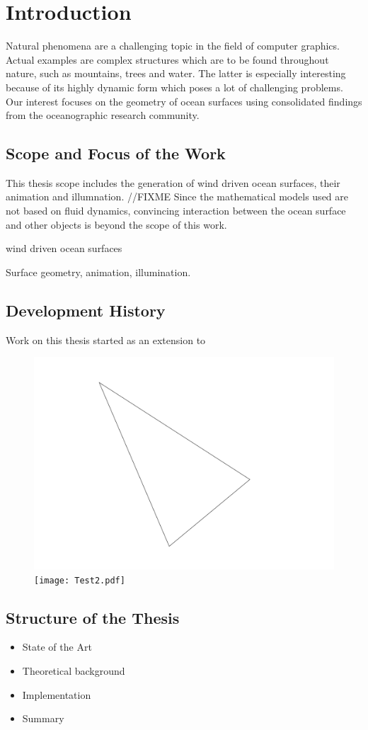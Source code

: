 \chapter{Introduction}

Natural phenomena are a challenging topic in the field of computer graphics.
Actual examples are complex structures which are to be found throughout nature,
such as mountains, trees and water. The latter is especially interesting
because of its highly dynamic form which poses a lot of challenging problems.
Our interest focuses on the geometry of ocean surfaces using
consolidated findings from the oceanographic research community.

\section{Scope and Focus of the Work}

This thesis scope includes the generation of wind driven ocean surfaces, their
animation and illumnation. //FIXME
Since the mathematical models used are not based on fluid dynamics,
convincing interaction between the ocean surface and other objects is beyond the
scope of this work.

wind driven ocean surfaces

Surface geometry, animation, illumination.

\section{Development History}

Work on this thesis started as an extension to \cite{thesis:rost}

\begin{figure}[p]
\begin{center}
\includegraphics[scale=1.0]{test.pdf}
\texttt{[image: Test2.pdf]}
\end{center}
\end{figure}

\section{Structure of the Thesis}

\begin{itemize}

\item State of the Art
\item Theoretical background
\item Implementation
\item Summary

\end{itemize}

